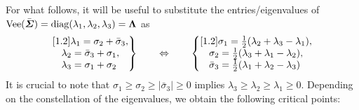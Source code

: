 For what follows, it will be useful to substitute the entries/eigenvalues of $\operatorname{Vee}(\bar{\boldsymbol{\varSigma}}) = \operatorname{diag}(\lambda_1, \lambda_2, \lambda_3) = \boldsymbol{\Lambda}$ as
\begin{align}
 \left.\begin{matrix}[1.2]
 \lambda_1 = \sigma_2 + \bar{\sigma}_3, \\
 \lambda_2 = \bar{\sigma}_3 + \sigma_1, \\
 \lambda_3 = \sigma_1 + \sigma_2\hphantom{,}  
 \end{matrix}\right\}
\qquad\Leftrightarrow \qquad
 \left\{\begin{matrix}[1.2]
 \sigma_1 = \tfrac{1}{2} (\lambda_2 + \lambda_3 - \lambda_1), \\
 \sigma_2 = \tfrac{1}{2} (\lambda_3 + \lambda_1 - \lambda_2), \\
 \bar{\sigma}_3 = \tfrac{1}{2} (\lambda_1 + \lambda_2 - \lambda_3)\hphantom{,}  
 \end{matrix}\right.
\end{align} 
It is crucial to note that $\sigma_1 \geq \sigma_2 \geq |\bar{\sigma}_3| \geq 0$ implies $\lambda_3 \geq \lambda_2 \geq \lambda_1 \geq 0$.
Depending on the constellation of the eigenvalues, we obtain the following critical points:
